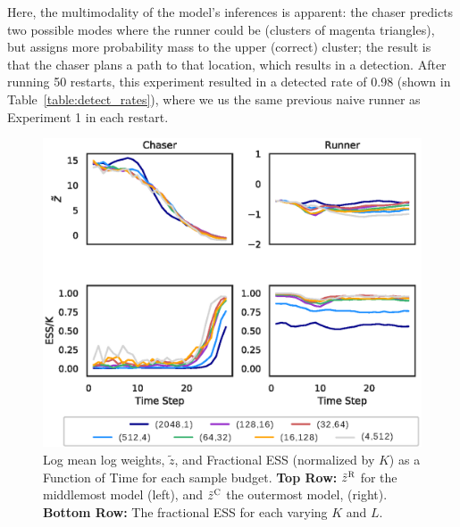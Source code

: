 \documentclass[twoside]{article}
\begin{document}
Here, the multimodality of the model's inferences is apparent: the chaser predicts two possible modes where the runner could be (clusters of magenta triangles), but assigns more probability mass to the upper (correct) cluster; the result is that the chaser plans a path to that location, which results in a detection. After running 50 restarts, this experiment resulted in a detected rate of 0.98 (shown in Table~\ref{table:detect_rates}), where we us the same previous naive runner as Experiment 1 in each restart.


\begin{figure}[!t]
\begin{center}
\centerline{\hspace{-0.2em}\includegraphics[width=1.05\columnwidth]{EXP-particle_exp_updated_legend.eps}}
\caption{ Log mean log weights, $\tilde{z}$, and Fractional ESS (normalized by $K$) as a Function of Time for each sample budget. \textbf{Top Row:}  $\tilde{z}^\textsc{R}$ for the middlemost model (left), and $\tilde{z}^\textsc{C}$ the outermost model, (right). \textbf{Bottom Row:} The fractional ESS for each varying $K$ and $L$.  }
\label{fig:log_means}
\end{center}
\vskip -0.4in
\end{figure} 
\end{document}
